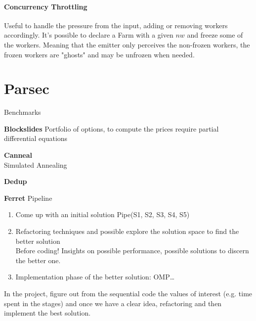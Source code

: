 \documentclass[10pt]{report}
\begin{document}
\paragraph{Concurrency Throttling} Useful to handle the pressure from the input, adding or removing workers accordingly. It's possible to declare a Farm with a given $nw$ and freeze some of the workers. Meaning that the emitter only perceives the non-frozen workers, the frozen workers are "ghosts" and may be unfrozen when needed.
\section{Parsec} Benchmarks
\begin{list}{}{}
	\item \textbf{Blockslides} Portfolio of options, to compute the prices require partial differential equations
	\item \textbf{Canneal}\\
	Simulated Annealing
	\item \textbf{Dedup}
	\item \textbf{Ferret} Pipeline
\end{list}
\begin{enumerate}
	\item Come up with an initial solution Pipe(S1, S2, S3, S4, S5)
	\item Refactoring techniques and possible explore the solution space to find the better solution\\
	Before coding! Insights on possible performance, possible solutions to discern the better one.
	\item Implementation phase of the better solution: OMP\ldots
\end{enumerate}
In the project, figure out from the sequential code the values of interest (e.g. time spent in the stages) and once we have a clear idea, refactoring and then implement the best solution.
\end{document}
